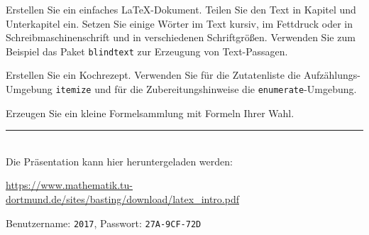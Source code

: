 \documentclass[fleqn,idxtotoc,bibtotoc,pointlessnumbers,ngerman]{scrartcl}
\newcommand{\keyword}[1]{\texttt{\color{darkgray}#1}}
\begin{document}


\begin{aufg} \label{aufgabe-hello-world}
Erstellen Sie ein einfaches \LaTeX-Dokument. Teilen Sie den Text in Kapitel und Unterkapitel ein. Setzen Sie einige Wörter im Text kursiv, im Fettdruck oder in Schreibmaschinenschrift und in verschiedenen Schriftgrößen. Verwenden Sie zum Beispiel das Paket \keyword{blindtext} zur Erzeugung von Text-Passagen.

\end{aufg}

\begin{aufg}
Erstellen Sie ein Kochrezept. Verwenden Sie für die Zutatenliste die Aufzählungs-Umgebung \keyword{itemize} und für die Zubereitungshinweise die \keyword{enumerate}-Umgebung.
\end{aufg}

\begin{aufg}
Erzeugen Sie ein kleine Formelsammlung mit Formeln Ihrer Wahl.
\end{aufg}

\vfill

\hrule ~\\[-0.5cm]

\noindent Die Präsentation kann hier heruntergeladen werden:
\begin{center}
	\url{https://www.mathematik.tu-dortmund.de/sites/basting/download/latex\_intro.pdf}
\end{center}
Benutzername: {\tt 2017}, Passwort: {\tt 27A-9CF-72D}
\end{document}

